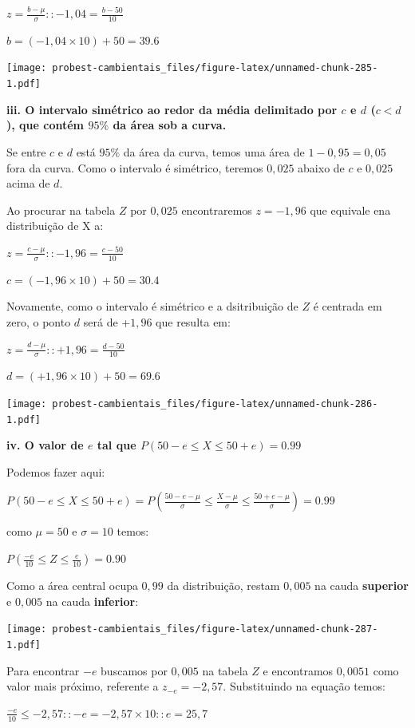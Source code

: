 \documentclass[
]{book}
\begin{document}
\(z = \frac{b - \mu}{\sigma} :: -1,04 = \frac{b - 50}{10}\)

\(b = (-1,04 \times 10) + 50 = 39.6\)

\texttt{[image: probest-cambientais\_files/figure-latex/unnamed-chunk-285-1.pdf]}

\textbf{iii. O intervalo simétrico ao redor da média delimitado por \(c\) e \(d\) (\(c < d\)), que contém \(95\%\) da área sob a curva.}

Se entre \(c\) e \(d\) está \(95\%\) da área da curva, temos uma área de \(1 - 0,95 = 0,05\) fora da curva. Como o intervalo é simétrico, teremos \(0,025\) abaixo de \(c\) e \(0,025\) acima de \(d\).

Ao procurar na tabela \(Z\) por \(0,025\) encontraremos \(z = -1,96\) que equivale ena distribuição de X a:

\(z = \frac{c - \mu}{\sigma} :: -1,96 = \frac{c - 50}{10}\)

\(c = (-1,96 \times 10) + 50 = 30.4\)

Novamente, como o intervalo é simétrico e a dsitribuição de \(Z\) é centrada em zero, o ponto \(d\) será de +\(1,96\) que resulta em:

\(z = \frac{d - \mu}{\sigma} :: +1,96 = \frac{d - 50}{10}\)

\(d = (+1,96 \times 10) + 50 = 69.6\)

\texttt{[image: probest-cambientais\_files/figure-latex/unnamed-chunk-286-1.pdf]}

\textbf{iv. O valor de \(e\) tal que \(P(50-e \le X \le 50+e) = 0.99\)}

Podemos fazer aqui:

\(P(50-e \le X \le 50+e) = P(\frac{50-e - \mu}{\sigma} \le \frac{X-\mu}{\sigma} \le \frac{50+e-\mu}{\sigma}) = 0.99\)

como \(\mu = 50\) e \(\sigma = 10\) temos:

\(P(\frac{-e}{10} \le Z \le \frac{e}{10}) = 0.90\)

Como a área central ocupa \(0,99\) da distribuição, restam \(0,005\) na cauda \textbf{superior} e \(0,005\) na cauda \textbf{inferior}:

\texttt{[image: probest-cambientais\_files/figure-latex/unnamed-chunk-287-1.pdf]}

Para encontrar \(-e\) buscamos por \(0,005\) na tabela \(Z\) e encontramos \(0,0051\) como valor mais próximo, referente a \(z_{-e} = -2,57\). Substituindo na equação temos:

\(\frac{-e}{10} \le -2,57 :: -e = -2,57 \times 10 :: e = 25,7\)
\end{document}
